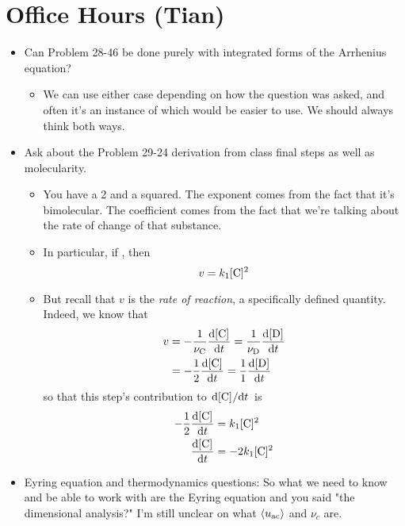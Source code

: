 \documentclass[../notes.tex]{subfiles}
\begin{document}
\section{Office Hours (Tian)}
\begin{itemize}
    \item Can Problem 28-46 be done purely with integrated forms of the Arrhenius equation?
    \begin{itemize}
        \item We can use either case depending on how the question was asked, and often it's an instance of which would be easier to use. We should always think both ways.
    \end{itemize}
    \item Ask about the Problem 29-24 derivation from class final steps as well as molecularity.
    \begin{itemize}
        \item You have a 2 and a squared. The exponent comes from the fact that it's bimolecular. The coefficient comes from the fact that we're talking about the rate of change of that substance.
        \item In particular, if , then
        \begin{equation*}
            v = k_1\cnc{C}^2
        \end{equation*}
        \item But recall that $v$ is the \emph{rate of reaction}, a specifically defined quantity. Indeed, we know that
        \begin{align*}
            v &= -\frac{1}{\nu_{\ce{C}}}\dv{\cnc{C}}{t}
                = \frac{1}{\nu_{\ce{D}}}\dv{\cnc{D}}{t}\\
            &= -\frac{1}{2}\dv{\cnc{C}}{t}
            = \frac{1}{1}\dv{\cnc{D}}{t}
        \end{align*}
        so that this step's contribution to $\dv*{\cnc{C}}{t}$ is
        \begin{align*}
            -\frac{1}{2}\dv{\cnc{C}}{t} &= k_1\cnc{C}^2\\
            \dv{\cnc{C}}{t} &= -2k_1\cnc{C}^2
        \end{align*}
    \end{itemize}
    \item Eyring equation and thermodynamics questions: So what we need to know and be able to work with are the Eyring equation and you said "the dimensional analysis?" I'm still unclear on what $\left\langle{u_\text{ac}}\right\rangle$ and $\nu_c$ are.
    \begin{itemize}

\end{itemize}
\end{itemize}
\end{document}
